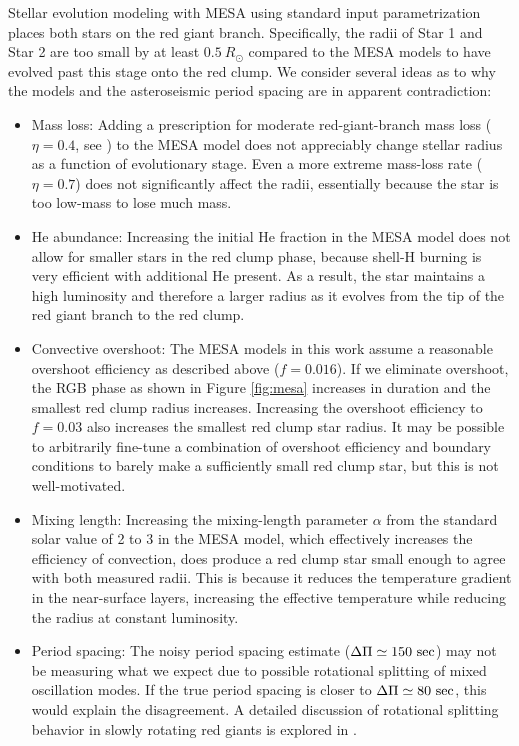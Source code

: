 Stellar evolution modeling with MESA using standard input parametrization places both stars on the red giant branch. Specifically, the radii of Star 1 and Star 2 are too small by at least $0.5 \ R_\odot$ compared to the MESA models to have evolved past this stage onto the red clump. We consider several ideas as to why the models and the asteroseismic period spacing are in apparent contradiction:
\begin{itemize}
\item Mass loss: Adding a prescription for moderate red-giant-branch mass loss ($\eta = 0.4$, see \citealt{mig12}) to the MESA model does not appreciably change stellar radius as a function of evolutionary stage. Even a more extreme mass-loss rate ($\eta = 0.7$) does not significantly affect the radii, essentially because the star is too low-mass to lose much mass.
\item He abundance: Increasing the initial He fraction in the MESA model does not allow for smaller stars in the red clump phase, because shell-H burning is very efficient with additional He present. As a result, the star maintains a high luminosity and therefore a larger radius as it evolves from the tip of the red giant branch to the red clump.
\item Convective overshoot: The MESA models in this work assume a reasonable overshoot efficiency as described above ($f = 0.016$). If we eliminate overshoot, the RGB phase as shown in Figure \ref{fig:mesa} increases in duration and the smallest red clump radius increases. Increasing the overshoot efficiency to $f = 0.03$ also increases the smallest red clump star radius. It may be possible to arbitrarily fine-tune a combination of overshoot efficiency and boundary conditions to barely make a sufficiently small red clump star, but this is not well-motivated.
\item Mixing length: Increasing the mixing-length parameter $\alpha$ from the standard solar value of 2 to 3 in the MESA model, which effectively increases the efficiency of convection, does produce a red clump star small enough to agree with both measured radii. This is because it reduces the temperature gradient in the near-surface layers, increasing the effective temperature while reducing the radius at constant luminosity. 
\item Period spacing: The noisy period spacing estimate ($\Delta \Pi \simeq 150 \ \rm{sec}$) may not be measuring what we expect due to possible rotational splitting of mixed oscillation modes. If the true period spacing is closer to $\Delta \Pi \simeq 80 \ \rm{sec}$, this would explain the disagreement. A detailed discussion of rotational splitting behavior in slowly rotating red giants is explored in \citet{gou13}.
\end{itemize}
